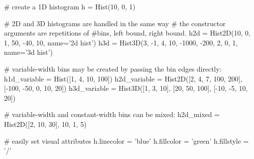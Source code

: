 \begin{footnotesize}
\begin{pyglist}[language=python,texcl=true,abovecaptionskip=0,style=vs,bgcolor=Moccasin]

# create a 1D histogram
h = Hist(10, 0, 1)

# 2D and 3D histograms are handled in the same way
# the constructor arguments are repetitions of #bins, left bound, right bound.
h2d = Hist2D(10, 0, 1, 50, -40, 10, name='2d hist')
h3d = Hist3D(3, -1, 4, 10, -1000, -200, 2, 0, 1, name='3d hist')

# variable-width bins may be created by passing the bin edges directly:
h1d_variable = Hist([1, 4, 10, 100])
h2d_variable = Hist2D([2, 4, 7, 100, 200], [-100, -50, 0, 10, 20])
h3d_variable = Hist3D([1, 3, 10], [20, 50, 100], [-10, -5, 10, 20])

# variable-width and constant-width bins can be mixed:
h2d_mixed = Hist2D([2, 10, 30], 10, 1, 5)

# easily set visual attributes
h.linecolor = 'blue'
h.fillcolor = 'green'
h.fillstyle = '/'
\end{pyglist}
\end{footnotesize}
